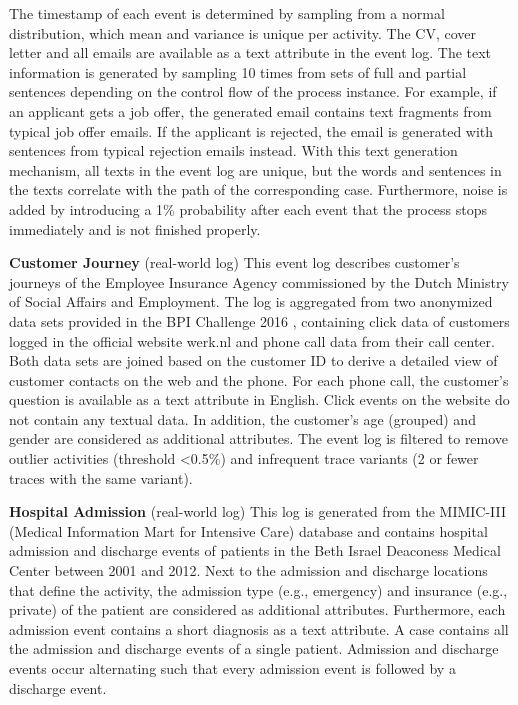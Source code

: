 The timestamp of each event is determined by sampling from a normal distribution, which mean and variance is unique per activity.
The CV, cover letter and all emails are available as a text attribute in the event log.
The text information is generated by sampling 10 times from sets of full and partial sentences depending on the control flow of the process instance.
For example, if an applicant gets a job offer, the generated email contains text fragments from typical job offer emails.
If the applicant is rejected, the email is generated with sentences from typical rejection emails instead.
With this text generation mechanism, all texts in the event log are unique, but the words and sentences in the texts correlate with the path of the corresponding case.
Furthermore, noise is added by introducing a 1\% probability after each event that the process stops immediately and is not finished properly.

\textbf{Customer Journey} (real-world log) This event log describes customer's journeys of the Employee Insurance Agency commissioned by the Dutch Ministry of Social Affairs and Employment.
The log is aggregated from two anonymized data sets provided in the BPI Challenge 2016 \cite{bpichallenge2016}, containing click data of customers logged in the official website werk.nl and phone call data from their call center.
Both data sets are joined based on the customer ID to derive a detailed view of customer contacts on the web and the phone.
For each phone call, the customer’s question is available as a text attribute in English.
Click events on the website do not contain any textual data.
In addition, the customer’s age (grouped) and gender are considered as additional attributes.
The event log is filtered to remove outlier activities (threshold <0.5\%) and infrequent trace variants (2 or fewer traces with the same variant).

\textbf{Hospital Admission} (real-world log) This log is generated from the MIMIC-III (Medical Information Mart for Intensive Care) database \cite{johnson2016mimic} and contains hospital admission and discharge events of patients in the Beth Israel Deaconess Medical Center between 2001 and 2012.
Next to the admission and discharge locations that define the activity, the admission type (e.g., emergency) and insurance (e.g., private) of the patient are considered as additional attributes.
Furthermore, each admission event contains a short diagnosis as a text attribute.
A case contains all the admission and discharge events of a single patient.
Admission and discharge events occur alternating such that every admission event is followed by a discharge event.

